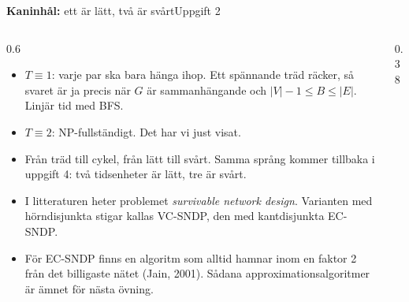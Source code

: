 \documentclass[aspectratio=169,10pt]{beamer}
\newcommand{\rabbit}{\textcolor{warnorange}{\textbf{Kaninhål:}} }
\begin{document}
\begin{frame}{\rabbit ett är lätt, två är svårt}{Uppgift 2}
  \begin{columns}[T]
    \begin{column}{0.6\textwidth}
      \begin{itemize}
        \item<1-> $T\equiv 1$: varje par ska bara hänga ihop. Ett spännande träd räcker, så svaret är ja precis när $G$ är sammanhängande och $|V|-1\le B\le|E|$. Linjär tid med BFS.
        \item<2-> $T\equiv 2$: NP-fullständigt. Det har vi just visat.
        \item<3-> Från träd till cykel, från lätt till svårt. Samma språng kommer tillbaka i uppgift 4: två tidsenheter är lätt, tre är svårt.
        \item<4-> I litteraturen heter problemet \emph{survivable network design}. Varianten med hörndisjunkta stigar kallas VC-SNDP, den med kantdisjunkta EC-SNDP.
        \item<5-> För EC-SNDP finns en algoritm som alltid hamnar inom en faktor 2 från det billigaste nätet (Jain, 2001). Sådana approximationsalgoritmer är ämnet för nästa övning.
      \end{itemize}
    \end{column}
    \begin{column}{0.38\textwidth}
      \centering
    \end{column}
  \end{columns}
\end{frame}
\end{document}
